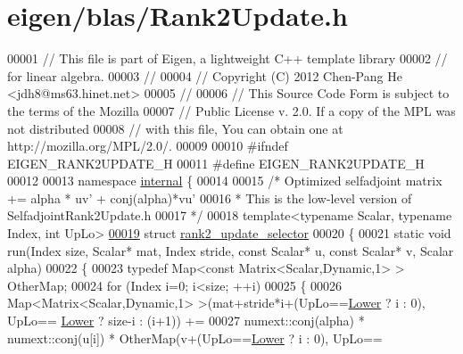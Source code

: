 \hypertarget{eigen_2blas_2_rank2_update_8h_source}{}\section{eigen/blas/\+Rank2\+Update.h}
\label{eigen_2blas_2_rank2_update_8h_source}

\begin{DoxyCode}
00001 \textcolor{comment}{// This file is part of Eigen, a lightweight C++ template library}
00002 \textcolor{comment}{// for linear algebra.}
00003 \textcolor{comment}{//}
00004 \textcolor{comment}{// Copyright (C) 2012 Chen-Pang He <jdh8@ms63.hinet.net>}
00005 \textcolor{comment}{//}
00006 \textcolor{comment}{// This Source Code Form is subject to the terms of the Mozilla}
00007 \textcolor{comment}{// Public License v. 2.0. If a copy of the MPL was not distributed}
00008 \textcolor{comment}{// with this file, You can obtain one at http://mozilla.org/MPL/2.0/.}
00009 
00010 \textcolor{preprocessor}{#ifndef EIGEN\_RANK2UPDATE\_H}
00011 \textcolor{preprocessor}{#define EIGEN\_RANK2UPDATE\_H}
00012 
00013 \textcolor{keyword}{namespace }\hyperlink{namespaceinternal}{internal} \{
00014 
00015 \textcolor{comment}{/* Optimized selfadjoint matrix += alpha * uv' + conj(alpha)*vu'}
00016 \textcolor{comment}{ * This is the low-level version of SelfadjointRank2Update.h}
00017 \textcolor{comment}{ */}
00018 \textcolor{keyword}{template}<\textcolor{keyword}{typename} Scalar, \textcolor{keyword}{typename} Index, \textcolor{keywordtype}{int} UpLo>
\hyperlink{structinternal_1_1rank2__update__selector}{00019} \textcolor{keyword}{struct }\hyperlink{structinternal_1_1rank2__update__selector}{rank2\_update\_selector}
00020 \{
00021   \textcolor{keyword}{static} \textcolor{keywordtype}{void} run(Index size, Scalar* mat, Index stride, \textcolor{keyword}{const} Scalar* u, \textcolor{keyword}{const} Scalar* v, Scalar alpha)
00022   \{
00023     \textcolor{keyword}{typedef} Map<const Matrix<Scalar,Dynamic,1> > OtherMap;
00024     \textcolor{keywordflow}{for} (Index i=0; i<size; ++i)
00025     \{
00026       Map<Matrix<Scalar,Dynamic,1> >(mat+stride*i+(UpLo==\hyperlink{group__enums_gga39e3366ff5554d731e7dc8bb642f83cda891792b8ed394f7607ab16dd716f60e6}{Lower} ? i : 0), UpLo==
      \hyperlink{group__enums_gga39e3366ff5554d731e7dc8bb642f83cda891792b8ed394f7607ab16dd716f60e6}{Lower} ? size-i : (i+1)) +=
00027       numext::conj(alpha) * numext::conj(u[i]) * OtherMap(v+(UpLo==\hyperlink{group__enums_gga39e3366ff5554d731e7dc8bb642f83cda891792b8ed394f7607ab16dd716f60e6}{Lower} ? i : 0), UpLo==

\end{DoxyCode}
